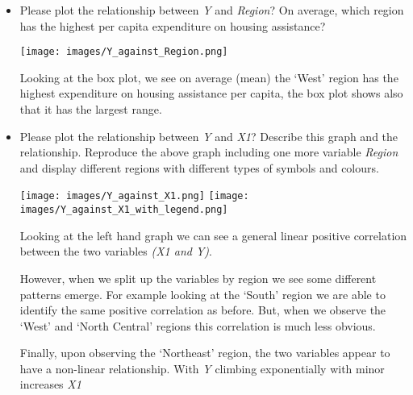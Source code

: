 \documentclass[12pt,letterpaper]{article}
\begin{document}
\begin{itemize}
\newpage
\item
Please plot the relationship between \emph{Y} and \emph{Region}? On average, which region has the highest per capita expenditure on housing assistance?
\vspace{.5cm}

\texttt{[image: images/Y\_against\_Region.png]}

Looking at the box plot, we see on average (mean) the `West' region has the highest expenditure on housing assistance per capita, the box plot shows also that it has the largest range.

\newpage
\item
Please plot the relationship between \emph{Y} and \emph{X1}? Describe this graph and the relationship. Reproduce the above graph including one more variable \emph{Region} and display different regions with different types of symbols and colours.

\texttt{[image: images/Y\_against\_X1.png]}
\texttt{[image: images/Y\_against\_X1\_with\_legend.png]}


Looking at the left hand graph we can see a general linear positive correlation between the two variables \textit{(X1 and Y)}.

However, when we split up the variables by region we see some different patterns emerge. For example looking at the `South' region we are able to identify the same positive correlation as before. But, when we observe the `West' and `North Central' regions this correlation is much less obvious.

Finally, upon observing the `Northeast' region, the two variables appear to have a non-linear relationship. With \textit{Y} climbing exponentially with minor increases \textit{X1}
\end{itemize}
\end{document}
